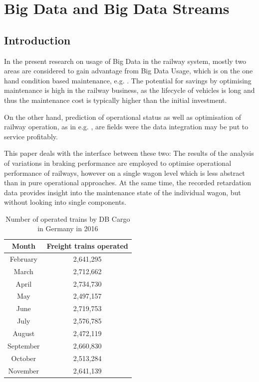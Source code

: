 \documentclass[a4paper, 12pt]{scrartcl}
\begin{document}
\section{Big Data and Big Data Streams}
\subsection{Introduction}
In the present research on usage of Big Data in the railway system, mostly two areas are considered to gain advantage from Big Data Usage, which is on the one hand condition based maintenance, e.g. \cite{fumeo2015condition, thaduri2015railway}. The potential for savings by optimising maintenance is high in the railway business, as the lifecycle of vehicles is long and thus the maintenance cost is typically higher than the initial investment.

On the other hand, prediction of operational status as well as optimisation of railway operation, as in e.g. \cite{papa2016delay, oneto2016delay}, are fields were the data integration may be put to service profitably.

This paper deals with the interface between these two: The results of the analysis of variations in braking performance are employed to optimise operational performance of railways, however on a single wagon level which is less abstract than in pure operational approaches. At the same time, the recorded retardation data  provides insight into the maintenance state of the individual wagon, but without looking into single components.

\begin{table}  
	\begin{center}  
	\caption{Number of operated trains by DB Cargo in Germany in 2016}
	\label{Tab:Zugfahrten}
	\begin{tabular}{|c|c|}
		\hline
		\textbf{Month}	& \textbf{Freight trains operated} \\ \hline
		February & 2,641,295 \\ \hline
		March & 2,712,662 \\ \hline
		April & 2,734,730 \\ \hline
		May & 2,497,157 \\ \hline
		June & 2,719,753 \\ \hline
		July & 2,576,785 \\ \hline
		August & 2,472,119 \\ \hline
		September & 2,660,830 \\ \hline
		October & 2,513,284 \\ \hline
		November & 2,641,139 \\ \hline 
	\end{tabular}
	\end{center}
\end{table}
\end{document}
